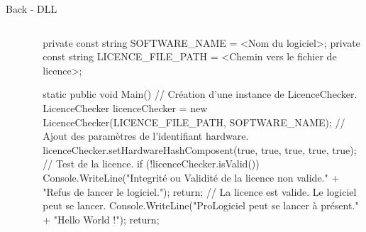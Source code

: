 \documentclass{cubeamer}
\begin{document}
\begin{frame}[fragile]{Back - DLL}
    \begin{columns}

        \begin{column}{.28\textwidth}
            \begin{figure}
                \includegraphics[scale=2.5]{img/Prologiciel.png}
            \end{figure}
        \end{column}

        \begin{column}{.72\textwidth}
\begin{code}{}
private const string SOFTWARE_NAME = <Nom du logiciel>;
private const string LICENCE_FILE_PATH = <Chemin vers le fichier de licence>;

static public void Main()
{
    // Création d'une instance de LicenceChecker.
    LicenceChecker licenceChecker = new LicenceChecker(LICENCE_FILE_PATH, SOFTWARE_NAME);
    // Ajout des paramètres de l'identifiant hardware.
    licenceChecker.setHardwareHashComposent(true, true, true, true, true);
    // Test de la licence.
    if (!licenceChecker.isValid())
    {
        Console.WriteLine("Integrité ou Validité de la licence non valide.\n"
            + "Refus de lancer le logiciel.\n");
        return;
    }
    // La licence est valide. Le logiciel peut se lancer.
    Console.WriteLine("ProLogiciel peut se lancer à présent.\n"
        + "Hello World !\n");
    return;
}
\end{code}
        \end{column}
    \end{columns}
\end{frame}
\end{document}
